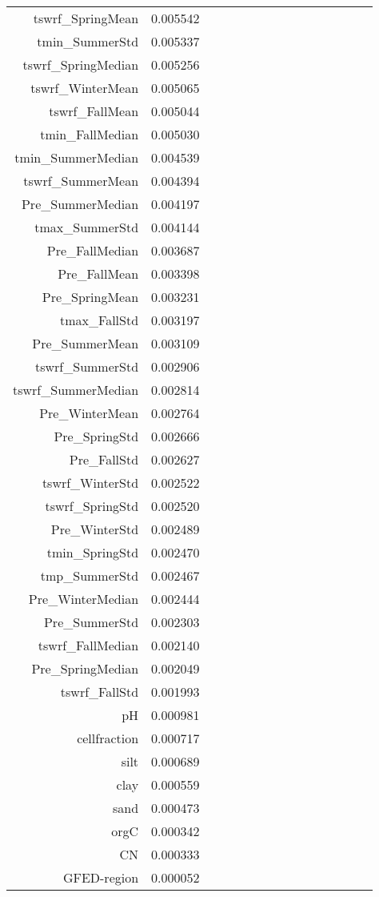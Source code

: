 \begin{table}[h]
\begin{tabular}{rrrrrrrrrrrrrrr}
tswrf_SpringMean & 0.005542 \\
tmin_SummerStd & 0.005337 \\
tswrf_SpringMedian & 0.005256 \\
tswrf_WinterMean & 0.005065 \\
tswrf_FallMean & 0.005044 \\
tmin_FallMedian & 0.005030 \\
tmin_SummerMedian & 0.004539 \\
tswrf_SummerMean & 0.004394 \\
Pre_SummerMedian & 0.004197 \\
tmax_SummerStd & 0.004144 \\
Pre_FallMedian & 0.003687 \\
Pre_FallMean & 0.003398 \\
Pre_SpringMean & 0.003231 \\
tmax_FallStd & 0.003197 \\
Pre_SummerMean & 0.003109 \\
tswrf_SummerStd & 0.002906 \\
tswrf_SummerMedian & 0.002814 \\
Pre_WinterMean & 0.002764 \\
Pre_SpringStd & 0.002666 \\
Pre_FallStd & 0.002627 \\
tswrf_WinterStd & 0.002522 \\
tswrf_SpringStd & 0.002520 \\
Pre_WinterStd & 0.002489 \\
tmin_SpringStd & 0.002470 \\
tmp_SummerStd & 0.002467 \\
Pre_WinterMedian & 0.002444 \\
Pre_SummerStd & 0.002303 \\
tswrf_FallMedian & 0.002140 \\
Pre_SpringMedian & 0.002049 \\
tswrf_FallStd & 0.001993 \\
pH & 0.000981 \\
cellfraction & 0.000717 \\
silt & 0.000689 \\
clay & 0.000559 \\
sand & 0.000473 \\
orgC & 0.000342 \\
CN & 0.000333 \\
GFED-region & 0.000052 \\
\bottomrule
\end{tabular}
\end{table}
